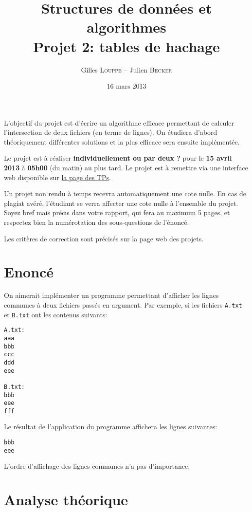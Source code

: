 \documentclass[a4paper,10pt]{article}
\title{
    \textbf{Structures de données et algorithmes}\\
    Projet 2: tables de hachage
}
\author{Gilles \textsc{Louppe} -- Julien \textsc{Becker}}
\date{16 mars 2013}
\begin{document}
\maketitle

L'objectif du projet est d'écrire un algorithme efficace permettant de
calculer l'intersection de deux fichiers (en terme de lignes). On
étudiera d'abord théoriquement différentes solutions et la plus
efficace sera ensuite implémentée.

Le projet est à réaliser {\bf individuellement ou par deux ?} pour le {\bf 15 avril 2013} à
{\bf 05h00} (du matin) au plus tard. Le projet est à remettre via une interface
web disponible sur \href{http://www.montefiore.ulg.ac.be/~glouppe/2012-2013/students.info0902.php}{la page des TPs}.

Un projet non rendu à temps recevra automatiquement une cote nulle. En
cas de plagiat avéré, l'étudiant se verra affecter une cote nulle à
l'ensemble du projet. Soyez bref mais précis dans votre rapport, qui
fera au maximum 5 pages, et respectez bien la numérotation des
sous-questions de l'énoncé.

Les critères de correction sont précisés sur la page web des projets.

\section{Enoncé}

On aimerait implémenter un programme permettant d'afficher les lignes
communes à deux fichiers passés en argument. Par exemple, si les
fichiers \texttt{A.txt} et \texttt{B.txt} ont les contenus suivants:

\begin{verbatim}
A.txt:
aaa
bbb
ccc
ddd
eee

B.txt:
bbb
eee
fff
\end{verbatim}

Le résultat de l'application du programme affichera les lignes suivantes:

\begin{verbatim}
bbb
eee
\end{verbatim}

L'ordre d'affichage des lignes communes n'a pas d'importance.

\section{Analyse théorique}
\end{document}
